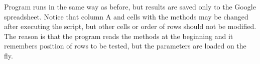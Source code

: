 Program runs in the same way as before, but results are saved only to the Google spreadsheet. Notice that column A and cells with the methods may be changed  after executing the script, but other cells or order of rows should not be modified. The reason is that the program reads the methods at the beginning and it remembers position of rows to be tested, but the parameters are loaded on the fly.

